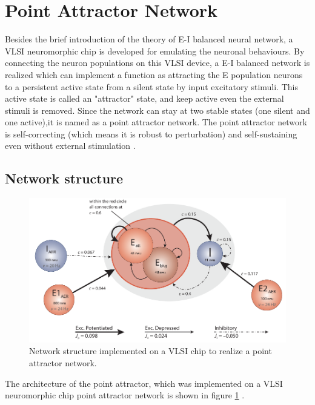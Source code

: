 \section{Point Attractor Network}
Besides the brief introduction of the theory of E-I balanced neural network, a VLSI neuromorphic chip is developed for emulating the neuronal behaviours. By connecting the neuron populations on this VLSI device, a E-I balanced network is realized which can implement a function as attracting the E population neurons to a persistent active state from a silent state by input excitatory stimuli. This active state is called an "attractor" state, and keep active even the external stimuli is removed. 
Since the network can stay at two stable states (one silent and one active),it  is named as a point attractor network. 
The point attractor network is self-correcting (which means it is robust to perturbation) and self-sustaining even without external stimulation \cite{giudiceRobustWorkingMemory2012}.

\subsection{Network structure}
\begin{figure}
	\centering
	\includegraphics[width=\columnwidth]{./img/readings/WM_Network_structure.pdf}
	\caption{Network structure implemented on a VLSI chip to realize a point attractor network.}
	\label{fig:reading_NNonchip}
\end{figure}

The architecture of the point attractor, which was implemented on a VLSI neuromorphic chip point attractor network is shown in figure \ref{fig:reading_NNonchip} \cite{giudiceRobustWorkingMemory2012}.

